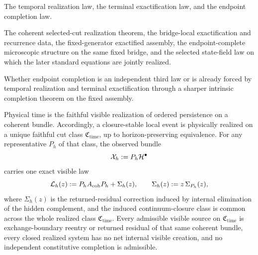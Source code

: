 \begin{tcolorbox}[colback=white, colframe=black!75, boxrule=0.9pt, title={Chapter 10 at a glance}]
\begin{description}[leftmargin=1.7em, itemsep=0.25em]
\item[Assumes.] The temporal realization law, the terminal exactification
      law, and the endpoint completion law.
\item[Proves.] The coherent selected-cut realization theorem, the
      bridge-local exactification and recurrence data, the fixed-generator
      exactified assembly, the endpoint-complete microscopic structure on
      the same fixed bridge, and the selected state-field law on which the
      later standard equations are jointly realized.
\item[Open.] Whether endpoint completion is an independent third law or is
      already forced by temporal realization and terminal exactification
      through a sharper intrinsic completion theorem on the fixed assembly.
\end{description}
\end{tcolorbox}

\begin{law}
\label{law:temporal-realization}
Physical time is the faithful visible realization of ordered persistence on a
coherent bundle. Accordingly, a closure-stable local event is physically
realized on a unique faithful cut class \(\mathfrak C_{\mathrm{time}}\), up to
horizon-preserving equivalence. For any representative \(P_h\) of that class,
the observed bundle
\[
\mathcal X_h:=P_h\mathcal{H}^\bullet
\]
carries one exact visible law
\[
\mathcal L_h(z):=P_hA_{\mathrm{coh}}P_h+\Sigma_h(z),
\qquad
\Sigma_h(z):=z\,\Sigma_{P_h}(z),
\]
where \(\Sigma_h(z)\) is the returned-residual correction induced by internal
elimination of the hidden complement, and the induced continuum-closure class
is common across the whole realized class \(\mathfrak C_{\mathrm{time}}\).
Every admissible visible source on \(\mathfrak C_{\mathrm{time}}\) is
exchange-boundary reentry or returned residual of that same coherent bundle,
every closed realized system has no net internal visible creation, and no
independent constitutive completion is admissible.
\end{law}

